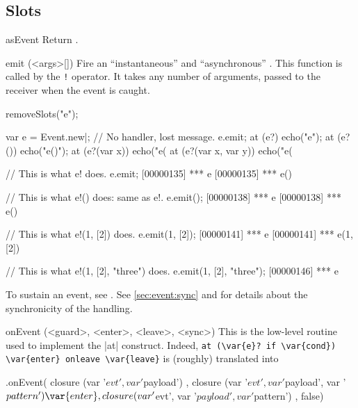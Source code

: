 \subsection{Slots}
\begin{urbiscriptapi}
\item[asEvent]
  Return \this.

\item[emit](<args>[])%
  Fire an ``instantaneous'' and ``asynchronous'' . This
  function is called by the \lstinline|!| operator.  It takes any number of
  arguments, passed to the receiver when the event is caught.
\begin{urbicomment}
removeSlots("e");
\end{urbicomment}
\begin{urbiscript}
var e = Event.new|;
// No handler, lost message.
e.emit;
at (e?)               echo("e");
at (e?())             echo("e()");
at (e?(var x))        echo("e(%
at (e?(var x, var y)) echo("e(%

// This is what e! does.
e.emit;
[00000135] *** e
[00000135] *** e()

// This is what e!() does: same as e!.
e.emit();
[00000138] *** e
[00000138] *** e()

// This is what e!(1, [2]) does.
e.emit(1, [2]);
[00000141] *** e
[00000141] *** e(1, [2])

// This is what e!(1, [2], "three") does.
e.emit(1, [2], "three");
[00000146] *** e
\end{urbiscript}

To sustain an event, see .  See \autoref{sec:event:sync}
and  for details about the synchronicity of the handling.


\item[onEvent](<guard>, <enter>, <leave>, <sync>)%
  This is the low-level routine used to implement the \lstindex|at|
  construct.  Indeed,
  \lstinline|at (\var{e}? if \var{cond}) \var{enter} onleave \var{leave}|
  is (roughly) translated into
\begin{urbiunchecked}
  .onEvent(
    closure (var '$evt', var '$payload')                 {   },
    closure (var '$evt', var '$payload', var '$pattern') { \var{enter} },
    closure (var '$evt', var '$payload', var '$pattern') {  },
    false)
\end{urbiunchecked}


\end{urbiscriptapi}
